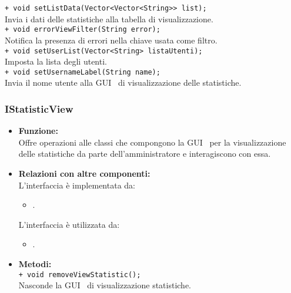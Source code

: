 {\begin{sloppypar}
{{{\begin{itemize}
					\texttt{+ void setListData(Vector<Vector<String>> list);}\\
					Invia i dati delle statistiche alla tabella di visualizzazione.\\
					
					\texttt{+ void errorViewFilter(String error);}\\
					Notifica la presenza di errori nella chiave usata come filtro.\\
					
					\texttt{+ void setUserList(Vector<String> listaUtenti);}\\
					Imposta la lista degli utenti.\\
					
					\texttt{+ void setUsernameLabel(String name);}\\
					Invia il nome utente alla GUI\g~ di visualizzazione delle statistiche.\\
			\end{itemize}
			}
		
		\subsubsection{IStatisticView}\label{ssub:IStatisticView}{
			\begin{itemize}
				\item[]  \textbf{Funzione:} \\
				Offre operazioni alle classi che compongono la GUI\g~ per la visualizzazione delle statistiche da parte dell'amministratore e interagiscono con essa.\\
				
				\item[]  \textbf{Relazioni con altre componenti:} \\
				L'interfaccia è implementata da:
				\begin{itemize}
					\item[] .
				\end{itemize}
				L'interfaccia è utilizzata da:
				\begin{itemize}
					\item[] .\\
				\end{itemize}

				\item[]  \textbf{Metodi:}\\
				\texttt{+ void removeViewStatistic();}\\
				Nasconde la GUI\g~ di visualizzazione statistiche.\\


\end{itemize}}}}
\end{sloppypar}}
